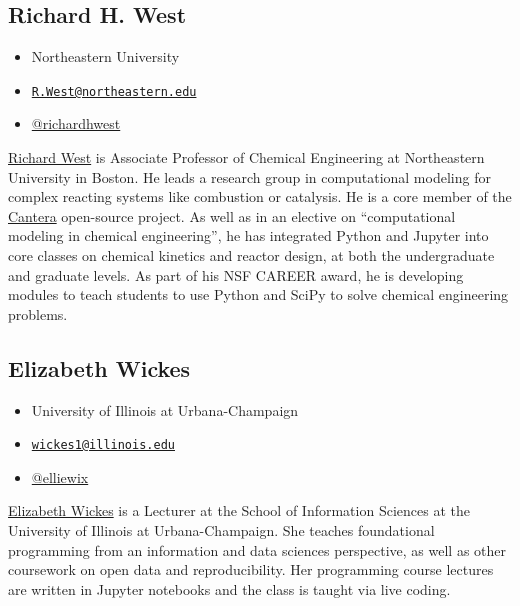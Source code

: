 \documentclass[]{book}
\providecommand{\tightlist}{%
  \setlength{\itemsep}{0pt}\setlength{\parskip}{0pt}}
\begin{document}
\subsection*{Richard H. West}\label{richard-h.-west}

\begin{itemize}
\tightlist
\item
  Northeastern University
\item
  \href{mailto:R.West@northeastern.edu}{\nolinkurl{R.West@northeastern.edu}}
\item
  \href{https://twitter.com/richardhwest}{@richardhwest}
\end{itemize}

\href{https://web.northeastern.edu/comocheng/}{Richard West} is
Associate Professor of Chemical Engineering at Northeastern University
in Boston. He leads a research group in computational modeling for
complex reacting systems like combustion or catalysis. He is a core
member of the \href{https://cantera.org/}{Cantera} open-source project.
As well as in an elective on ``computational modeling in chemical
engineering'', he has integrated Python and Jupyter into core classes on
chemical kinetics and reactor design, at both the undergraduate and
graduate levels. As part of his NSF CAREER award, he is developing
modules to teach students to use Python and SciPy to solve chemical
engineering problems.

\subsection*{Elizabeth Wickes}\label{elizabeth-wickes}

\begin{itemize}
\tightlist
\item
  University of Illinois at Urbana-Champaign
\item
  \href{mailto:wickes1@illinois.edu}{\nolinkurl{wickes1@illinois.edu}}
\item
  \href{https://twitter.com/elliewix}{@elliewix}
\end{itemize}

\href{https://ischool.illinois.edu/people/elizabeth-wickes}{Elizabeth
Wickes} is a Lecturer at the School of Information Sciences at the
University of Illinois at Urbana-Champaign. She teaches foundational
programming from an information and data sciences perspective, as well
as other coursework on open data and reproducibility. Her programming
course lectures are written in Jupyter notebooks and the class is taught
via live coding.
\end{document}
